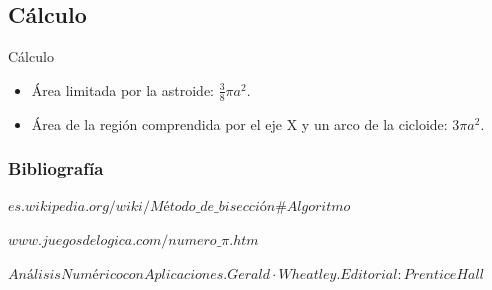 \documentclass{beamer}
\begin{document}
\subsection{Cálculo} 
\begin{frame}

\begin{block}{Cálculo}
\begin{itemize}
  \item Área limitada por la astroide: $\frac{3}{8}\pi a^2 $.
  \pause

  \item Área de la región comprendida por el eje X y un arco de la cicloide: $3 \pi a^2.$

\end{itemize}
\end{block}

\end{frame}

\begin{frame}
\frametitle{Bibliografía}
\begin{thebibliography}
  \beamertermplatebookbibitems
  {\small $es.wikipedia.org/wiki/Método\_de\_bisección\#Algoritmo$}
  
  \beamertermplatebookbibitems
  {\small $www.juegosdelogica.com/numero\_\pi.htm$}
  
  \beamertermplatebookbibitems
  {\small $Análisis Numérico con Aplicaciones. Gerald·Wheatley. Editorial: Prentice Hall$}
  
\end{thebibliography}
\end{frame}
\end{document}
